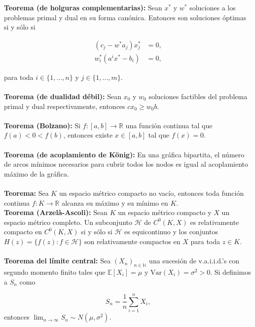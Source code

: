 \documentclass[a4paper,11pt, twocolumn]{article}
\newcommand{\NN}{\mathbb{N}}
\newcommand{\EE}{\mathbb{E}}
\newcommand{\RR}{\mathbb{R}}
\newcommand{\Hh}{\mathcal{H}}
\newcommand{\1}{\mathbbm{1}}
\begin{document}
\textbf{Teorema (de holguras complementarias):} Sean $x^*$ y $w^*$ soluciones a los problemas primal y dual en su forma canónica. Entonces son soluciones óptimas si y sólo si

\begin{align*}
(c_j-w^*a_j)x_j^* &=0,\\	
w_i^*(a^ix^*-b_i) &= 0,
\end{align*}

para toda $i\in\{1,\dots,n\}$ y $j\in\{1,\dots,m\}$.\\\\

\textbf{Teorema (de dualidad débil):} Sean $x_0$ y $w_0$ soluciones factibles del problema primal y dual respectivamente, entonces $cx_0\geq w_0 b$.\\\\

\textbf{Teorema (Bolzano):} Si $f:[a,b]\to \RR$ una función continua tal que $f(a)<0<f(b)$, entonces existe $x\in[a,b]$ tal que $f(x)=0$.\\\\

\textbf{Teorema (de acoplamiento de König):} En una gráfica bipartita, el número de arcos mínimos necesarios para cubrir todos los nodos es igual al acoplamiento máximo de la gráfica.\\\\


\textbf{Teorema:} Sea $K$ un espacio métrico compacto no vacío, entonces toda función continua $f:K\to\RR$ alcanza su máximo y su mínimo en $K$.\\

\textbf{Teorema (Arzelà-Ascoli):} Sean $K$ un espacio métrico compacto y $X$ un espacio métrico completo. Un subconjunto $\Hh$ de $C^0(K,X)$ es relativamente compacto en $C^0(K,X)$ si y sólo si $\Hh$ es equicontinuo y los conjuntos $H(z) = \{f(z):f\in\Hh\}$ son relativamente compactos en $X$ para toda $z\in K$. \\\\

\textbf{Teorema del límite central:} Sea $(X_n)_{n\in \NN}$ una sucesión de v.a.i.i.d.'s con segundo momento finito tales que $\EE[X_i]=\mu$ y $\mathrm{Var}(X_i)=\sigma^2>0$. Si definimos a $S_n$ como

\[S_n = \dfrac{1}{n}\sum_{i=1}^n X_i,\] 
entonces $\lim_{n\to\infty} S_n \sim N(\mu,\sigma^2)$.\\\\
\end{document}
